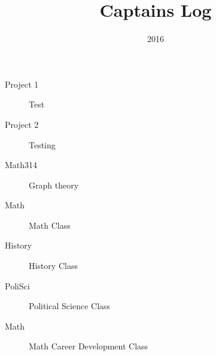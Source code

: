 \documentclass[10pt]{article}
\title{Captains Log}
\date{2016}
\begin{document}
\thispagestyle{empty}
\maketitle

\newpage

\thispagestyle{empty}

\begin{spacing}{1}
\tableofcontents
\listoffigures
\listoftables
\listoftodos
\end{spacing}

\newpage


\begin{projects}
\label{sec:projects}
\begin{description}
	\item [Project 1] Test
	\item [Project 2] Testing
\end{description}
\end{projects}

\pagebreak
\begin{classes}
\label{sec:classes}
\begin{description}
	\item [Math314] Graph theory
	\item [Math] Math Class
	\item [History] History Class
	\item [PoliSci] Political Science Class
	\item [Math] Math Career Development Class
\end{description}
\end{classes}

\pagebreak 
\end{document}

